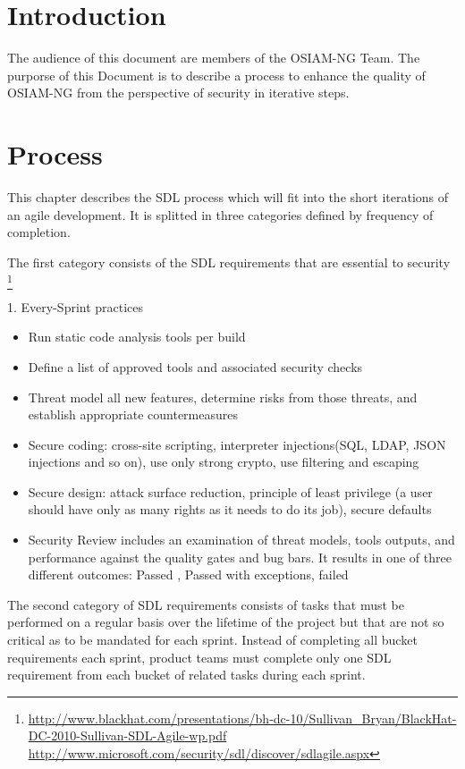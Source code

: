 \section{Introduction}

The audience of this document are members of the OSIAM-NG Team.
The purporse of this Document is to describe a process to enhance the quality of
OSIAM-NG from the perspective of security in iterative steps.

\section{Process}
This chapter describes the SDL process which will fit into the short iterations of an agile development. It is splitted in three categories defined by frequency of completion.

The first category consists of the SDL requirements that are essential to security \footnote{\url{http://www.blackhat.com/presentations/bh-dc-10/Sullivan_Bryan/BlackHat-DC-2010-Sullivan-SDL-Agile-wp.pdf} \url{http://www.microsoft.com/security/sdl/discover/sdlagile.aspx}}

1. Every-Sprint practices
\begin{itemize}
	\item Run static code analysis tools per build
	\item Define a list of approved tools and associated security checks
	\item Threat model all new features, determine risks from those threats, and establish appropriate countermeasures 
	\item Secure coding: cross-site scripting, interpreter injections(SQL, LDAP, JSON injections and so on), use only strong crypto, use filtering and escaping
	\item Secure design: attack surface reduction, principle of least privilege (a user should have only as many rights as it needs to do its job), secure defaults	
	\item Security Review includes an examination of threat models, tools outputs, and performance against the quality gates and bug bars. It results in one of three different outcomes: Passed , Passed with exceptions, failed  
\end{itemize}

The second category of SDL requirements consists of tasks that must be performed on a regular basis over the lifetime of the project but that are not so critical as to be mandated for each sprint.
Instead of completing all bucket requirements each sprint, product teams must complete only one SDL requirement from each bucket of related tasks during each sprint.

